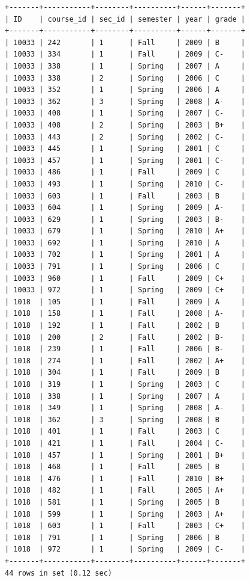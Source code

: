 \documentclass{article}
\begin{document}
\begin{lstlisting}
+-------+-----------+--------+----------+------+-------+
| ID    | course_id | sec_id | semester | year | grade |
+-------+-----------+--------+----------+------+-------+
| 10033 | 242       | 1      | Fall     | 2009 | B     |
| 10033 | 334       | 1      | Fall     | 2009 | C-    |
| 10033 | 338       | 1      | Spring   | 2007 | A     |
| 10033 | 338       | 2      | Spring   | 2006 | C     |
| 10033 | 352       | 1      | Spring   | 2006 | A     |
| 10033 | 362       | 3      | Spring   | 2008 | A-    |
| 10033 | 408       | 1      | Spring   | 2007 | C-    |
| 10033 | 408       | 2      | Spring   | 2003 | B+    |
| 10033 | 443       | 2      | Spring   | 2002 | C-    |
| 10033 | 445       | 1      | Spring   | 2001 | C     |
| 10033 | 457       | 1      | Spring   | 2001 | C-    |
| 10033 | 486       | 1      | Fall     | 2009 | C     |
| 10033 | 493       | 1      | Spring   | 2010 | C-    |
| 10033 | 603       | 1      | Fall     | 2003 | B     |
| 10033 | 604       | 1      | Spring   | 2009 | A-    |
| 10033 | 629       | 1      | Spring   | 2003 | B-    |
| 10033 | 679       | 1      | Spring   | 2010 | A+    |
| 10033 | 692       | 1      | Spring   | 2010 | A     |
| 10033 | 702       | 1      | Spring   | 2001 | A     |
| 10033 | 791       | 1      | Spring   | 2006 | C     |
| 10033 | 960       | 1      | Fall     | 2009 | C+    |
| 10033 | 972       | 1      | Spring   | 2009 | C+    |
| 1018  | 105       | 1      | Fall     | 2009 | A     |
| 1018  | 158       | 1      | Fall     | 2008 | A-    |
| 1018  | 192       | 1      | Fall     | 2002 | B     |
| 1018  | 200       | 2      | Fall     | 2002 | B-    |
| 1018  | 239       | 1      | Fall     | 2006 | B-    |
| 1018  | 274       | 1      | Fall     | 2002 | A+    |
| 1018  | 304       | 1      | Fall     | 2009 | B     |
| 1018  | 319       | 1      | Spring   | 2003 | C     |
| 1018  | 338       | 1      | Spring   | 2007 | A     |
| 1018  | 349       | 1      | Spring   | 2008 | A-    |
| 1018  | 362       | 3      | Spring   | 2008 | B     |
| 1018  | 401       | 1      | Fall     | 2003 | C     |
| 1018  | 421       | 1      | Fall     | 2004 | C-    |
| 1018  | 457       | 1      | Spring   | 2001 | B+    |
| 1018  | 468       | 1      | Fall     | 2005 | B     |
| 1018  | 476       | 1      | Fall     | 2010 | B+    |
| 1018  | 482       | 1      | Fall     | 2005 | A+    |
| 1018  | 581       | 1      | Spring   | 2005 | B     |
| 1018  | 599       | 1      | Spring   | 2003 | A+    |
| 1018  | 603       | 1      | Fall     | 2003 | C+    |
| 1018  | 791       | 1      | Spring   | 2006 | B     |
| 1018  | 972       | 1      | Spring   | 2009 | C-    |
+-------+-----------+--------+----------+------+-------+
44 rows in set (0.12 sec)
\end{lstlisting}
\end{document}
